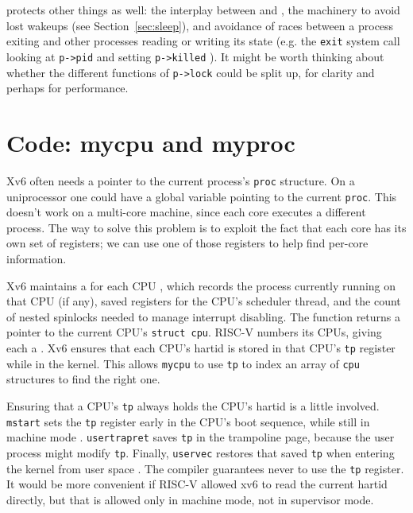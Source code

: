 protects other things as well:
the interplay between
and
,
the machinery to avoid lost wakeups (see Section~\ref{sec:sleep}),
and avoidance of races between a process exiting and other processes
reading or writing its state (e.g. the \lstinline{exit}
system call looking at \lstinline{p->pid} and
setting \lstinline{p->killed}
).
It might be worth thinking about whether the 
different functions of
\lstinline{p->lock}
could be split up, for clarity and perhaps
for performance.
\section{Code: mycpu and myproc}

Xv6 often needs a pointer to the current process's \lstinline{proc}
structure. On a uniprocessor one could have a global variable pointing
to the current \lstinline{proc}. This doesn't work on a multi-core
machine, since each core executes a different process. The way to
solve this problem is to exploit the fact that each core has its own
set of registers; we can use one of those registers to help find
per-core information.

Xv6 maintains a
for each CPU
,
which records
the process currently running
on that CPU (if any),
saved registers for the CPU's scheduler thread,
and the count of nested spinlocks needed to manage
interrupt disabling.
The function
returns a pointer to the current CPU's
\lstinline{struct cpu}.
RISC-V numbers its CPUs, giving each
a .
Xv6 ensures that each CPU's hartid is stored in that CPU's \lstinline{tp} register
while in the kernel.
This allows
\lstinline{mycpu} to use \lstinline{tp} to index an array
of \lstinline{cpu} structures to find the right one.

Ensuring that a CPU's \lstinline{tp} always holds the CPU's
hartid is a little involved. \lstinline{mstart} sets the \lstinline{tp}
register early in the CPU's boot sequence, while still in machine mode
.
\lstinline{usertrapret} saves \lstinline{tp} in the trampoline
page, because the user process might modify \lstinline{tp}.
Finally, \lstinline{uservec} restores that saved \lstinline{tp}
when entering the kernel from user space
.
The compiler guarantees never to use the \lstinline{tp}
register.
It would be more convenient if RISC-V allowed xv6 to read the
current hartid directly, but that is allowed only in
machine mode, not in supervisor mode.

